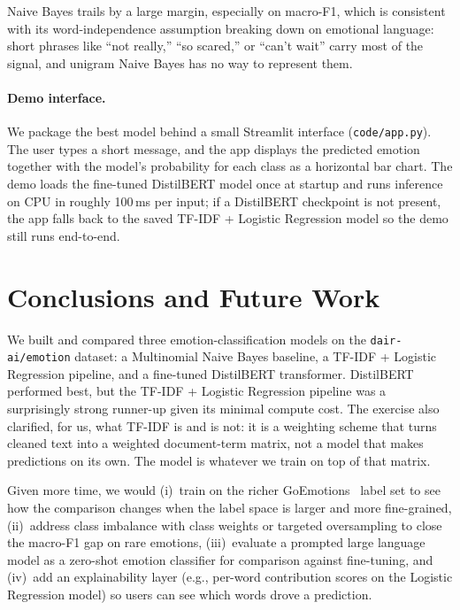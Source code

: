 \documentclass{article}
\theoremstyle{plain}
\begin{document}
Naive Bayes trails by a large margin, especially on macro-F1, which is
consistent with its word-independence assumption breaking down on
emotional language: short phrases like ``not really,'' ``so scared,''
or ``can't wait'' carry most of the signal, and unigram Naive Bayes has
no way to represent them.

\paragraph{Demo interface.} We package the best model behind a small
Streamlit interface (\texttt{code/app.py}). The user types a short message,
and the app displays the predicted emotion together with the model's
probability for each class as a horizontal bar chart. The demo loads the
fine-tuned DistilBERT model once at startup and runs inference on CPU in
roughly 100\,ms per input; if a DistilBERT checkpoint is not present, the
app falls back to the saved TF-IDF + Logistic Regression model so the demo
still runs end-to-end.

\section{Conclusions and Future Work}
\label{sec:conclusion}

We built and compared three emotion-classification models on the
\texttt{dair-ai/emotion} dataset: a Multinomial Naive Bayes baseline, a
TF-IDF + Logistic Regression pipeline, and a fine-tuned DistilBERT
transformer. DistilBERT performed best, but the TF-IDF + Logistic
Regression pipeline was a surprisingly strong runner-up given its minimal
compute cost. The exercise also clarified, for us, what TF-IDF is and is
not: it is a weighting scheme that turns cleaned text into a weighted
document-term matrix, not a model that makes predictions on its own. The
model is whatever we train on top of that matrix.

Given more time, we would (i)~train on the richer
GoEmotions~\cite{demszky2020goemotions} label set to see how the
comparison changes when the label space is larger and more fine-grained,
(ii)~address class imbalance with class weights or targeted oversampling
to close the macro-F1 gap on rare emotions, (iii)~evaluate a prompted
large language model as a zero-shot emotion classifier for comparison
against fine-tuning, and (iv)~add an explainability layer (e.g., per-word
contribution scores on the Logistic Regression model) so users can see
which words drove a prediction.



\end{document}
